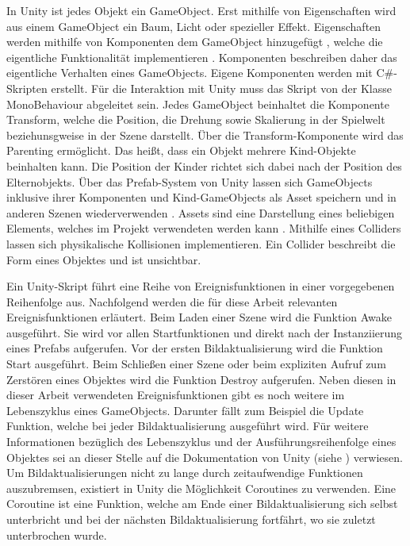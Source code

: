 In Unity ist jedes Objekt ein GameObject. Erst mithilfe von Eigenschaften wird aus einem GameObject ein Baum, Licht oder spezieller Effekt. \cite{GameObjects.2020} Eigenschaften werden mithilfe von Komponenten dem GameObject hinzugefügt \cite{GameObjects.2020}, welche die eigentliche Funktionalität implementieren \cite{GameObject.2020}. Komponenten beschreiben daher das eigentliche Verhalten eines GameObjects. Eigene Komponenten werden mit C\#-Skripten erstellt. Für die Interaktion mit Unity muss das Skript von der Klasse MonoBehaviour abgeleitet sein. \cite{CreateScripts.2020} Jedes GameObject beinhaltet die Komponente Transform, welche die Position, die Drehung sowie Skalierung in der Spielwelt beziehunsgweise in der Szene darstellt. Über die Transform-Komponente wird das Parenting ermöglicht. Das heißt, dass ein Objekt mehrere Kind-Objekte beinhalten kann. Die Position der Kinder richtet sich dabei nach der Position des Elternobjekts. \cite{Components.2020} Über das Prefab-System von Unity lassen sich GameObjects inklusive ihrer Komponenten und Kind-GameObjects als Asset speichern und in anderen Szenen wiederverwenden \cite{Prefabs.2020}. Assets sind eine Darstellung eines beliebigen Elements, welches im Projekt verwendeten werden kann \cite{Assets.2020}. Mithilfe eines Colliders lassen sich physikalische Kollisionen implementieren. Ein Collider beschreibt die Form eines Objektes und ist unsichtbar. \cite{Colliders.2020}

Ein Unity-Skript führt eine Reihe von Ereignisfunktionen in einer vorgegebenen Reihenfolge aus. Nachfolgend werden die für diese Arbeit relevanten Ereignisfunktionen erläutert. Beim Laden einer Szene wird die Funktion {\ttfamily Awake} ausgeführt. Sie wird vor allen Startfunktionen und direkt nach der Instanziierung eines Prefabs aufgerufen. Vor der ersten Bildaktualisierung wird die Funktion {\ttfamily Start} ausgeführt. Beim Schließen einer Szene oder beim expliziten Aufruf zum Zerstören eines Objektes wird die Funktion {\ttfamily Destroy} aufgerufen. Neben diesen in dieser Arbeit verwendeten Ereignisfunktionen gibt es noch weitere im Lebenszyklus eines GameObjects. Darunter fällt zum Beispiel die {\ttfamily Update} Funktion, welche bei jeder Bildaktualisierung ausgeführt wird. \cite{Order.2020} Für weitere Informationen bezüglich des Lebenszyklus und der Ausführungsreihenfolge eines Objektes sei an dieser Stelle auf die Dokumentation von Unity (siehe \cite{Order.2020}) verwiesen. \\
Um Bildaktualisierungen nicht zu lange durch zeitaufwendige Funktionen auszubremsen, existiert in Unity die Möglichkeit Coroutines zu verwenden. Eine Coroutine ist eine Funktion, welche am Ende einer Bildaktualisierung sich selbst unterbricht und bei der nächsten Bildaktualisierung fortfährt, wo sie zuletzt unterbrochen wurde. \cite{Coroutine.2020}

